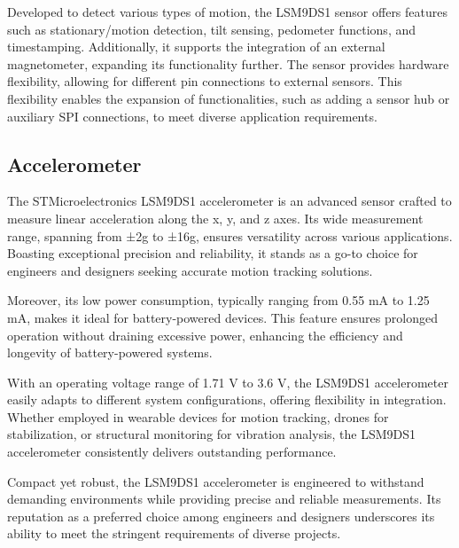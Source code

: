 Developed to detect various types of motion, the LSM9DS1 sensor offers features such as stationary/motion detection, tilt sensing, pedometer functions, and timestamping. Additionally, it supports the integration of an external magnetometer, expanding its functionality further. The sensor provides hardware flexibility, allowing for different pin connections to external sensors. This flexibility enables the expansion of functionalities, such as adding a sensor hub or auxiliary SPI connections, to meet diverse application requirements.

\bigskip

\subsection{Accelerometer}

The STMicroelectronics LSM9DS1 accelerometer is an advanced sensor crafted to measure linear acceleration along the x, y, and z axes. Its wide measurement range, spanning from ±2g to ±16g, ensures versatility across various applications. Boasting exceptional precision and reliability, it stands as a go-to choice for engineers and designers seeking accurate motion tracking solutions. \cite{STMicroelectronics_LSM9DS1:2024}
\bigskip 

Moreover, its low power consumption, typically ranging from 0.55 mA to 1.25 mA, makes it ideal for battery-powered devices. This feature ensures prolonged operation without draining excessive power, enhancing the efficiency and longevity of battery-powered systems.

\bigskip 

With an operating voltage range of 1.71 V to 3.6 V, the LSM9DS1 accelerometer easily adapts to different system configurations, offering flexibility in integration. Whether employed in wearable devices for motion tracking, drones for stabilization, or structural monitoring for vibration analysis, the LSM9DS1 accelerometer consistently delivers outstanding performance.

\bigskip 

Compact yet robust, the LSM9DS1 accelerometer is engineered to withstand demanding environments while providing precise and reliable measurements. Its reputation as a preferred choice among engineers and designers underscores its ability to meet the stringent requirements of diverse projects.

\bigskip 

